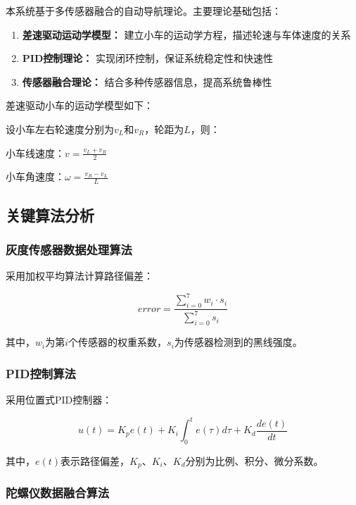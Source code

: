 \documentclass[UTF8]{ctexart}
\begin{document}
本系统基于多传感器融合的自动导航理论。主要理论基础包括：

\begin{enumerate}
    \item \textbf{差速驱动运动学模型：} 建立小车的运动学方程，描述轮速与车体速度的关系
    \item \textbf{PID控制理论：} 实现闭环控制，保证系统稳定性和快速性
    \item \textbf{传感器融合理论：} 结合多种传感器信息，提高系统鲁棒性
\end{enumerate}

差速驱动小车的运动学模型如下：

设小车左右轮速度分别为$v_L$和$v_R$，轮距为$L$，则：

小车线速度：$v = \frac{v_L + v_R}{2}$

小车角速度：$\omega = \frac{v_R - v_L}{L}$

\subsection{关键算法分析}

\subsubsection{灰度传感器数据处理算法}

采用加权平均算法计算路径偏差：

\begin{equation} \label{eq:line_error}
    error = \frac{\sum_{i=0}^{7} w_i \cdot s_i}{\sum_{i=0}^{7} s_i}
\end{equation}

其中，$w_i$为第$i$个传感器的权重系数，$s_i$为传感器检测到的黑线强度。

\subsubsection{PID控制算法}

采用位置式PID控制器：

\begin{equation} \label{eq:pid}
    u(t) = K_p e(t) + K_i \int_0^t e(\tau)d\tau + K_d \frac{de(t)}{dt}
\end{equation}

其中，$e(t)$表示路径偏差，$K_p$、$K_i$、$K_d$分别为比例、积分、微分系数。

\subsubsection{陀螺仪数据融合算法}
\end{document}
